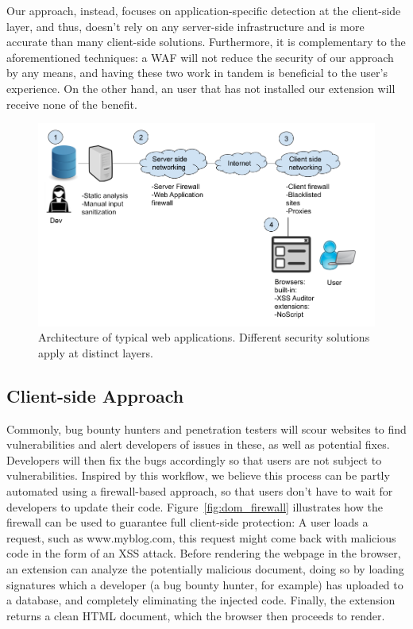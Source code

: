 Our approach, instead, focuses on application-specific detection at the client-side layer, and thus, doesn't rely on any server-side infrastructure and is more accurate than many client-side solutions. Furthermore, it is complementary to the aforementioned techniques: a WAF will not reduce the security of our approach by any means, and having these two work in tandem is beneficial to the user's experience. On the other hand, an user that has not installed our extension will receive none of the benefit.
\begin{figure}[h]
	\includegraphics[scale=0.3]{img/web_app_architecture.png}
	\caption{Architecture of typical web applications. Different security solutions apply at distinct layers.}
	\label{fig:web_architecture}
\end{figure}


\subsection{Client-side Approach}
 Commonly, bug bounty hunters and penetration testers will scour websites to find vulnerabilities and alert developers of issues in these, as well as potential fixes. Developers will then fix the bugs accordingly so that users are not subject to vulnerabilities. Inspired by this workflow, we believe this process can be partly automated using a firewall-based approach, so that users don't have to wait for developers to update their code. Figure~\ref{fig:dom_firewall} illustrates how the firewall can be used to guarantee full client-side protection: A user loads a request, such as www.myblog.com, this request might come back with malicious code in the form of an XSS attack. Before rendering the webpage in the browser, an extension can analyze the potentially malicious document, doing so by loading signatures which a developer (a bug bounty hunter, for example) has uploaded to a database, and completely eliminating the injected code. Finally, the extension returns a clean HTML document, which the browser then proceeds to render.
 
